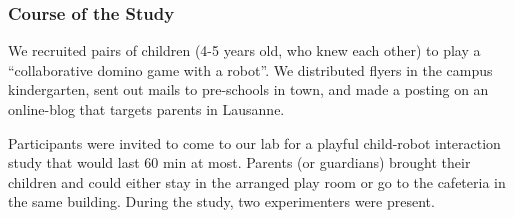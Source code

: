 \documentclass{sig-alternate}
\begin{document}
\subsubsection{Course of the Study}

We recruited pairs of children (4-5 years old, who knew each other) to play a
``collaborative domino game with a robot''. We distributed flyers in the campus
kindergarten, sent out mails to pre-schools in town, and made a posting on an
online-blog that targets parents in Lausanne.

Participants were invited to come to our lab for a playful child-robot
interaction study that would last 60 min at most. Parents (or guardians) brought
their children and could either stay in the arranged play room or go to the
cafeteria in the same building. During the study, two experimenters were
present.
\end{document}
